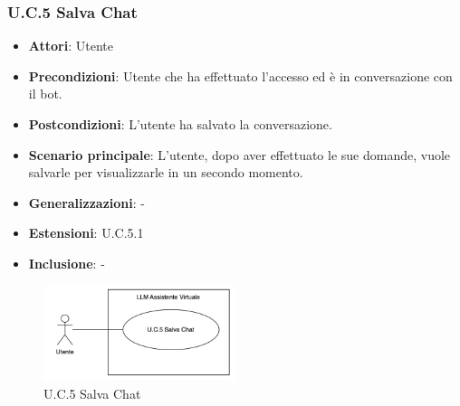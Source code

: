 \subsubsection{U.C.5 Salva Chat}
\begin{itemize}
    \item \textbf{Attori}: Utente
    \item \textbf{Precondizioni}: Utente che ha effettuato l'accesso ed è in conversazione con il bot.
    \item \textbf{Postcondizioni}: L'utente ha salvato la conversazione.
    \item \textbf{Scenario principale}: L'utente, dopo aver effettuato le sue domande, vuole salvarle per visualizzarle in un secondo momento.
    \item \textbf{Generalizzazioni}: -
    \item \textbf{Estensioni}: U.C.5.1
    \item \textbf{Inclusione}: -
\end{itemize}
\begin{figure}[H]
    \centering
    \includegraphics[width=0.5\textwidth]{img/UC5.png}
    \caption{U.C.5 Salva Chat}
\end{figure}

